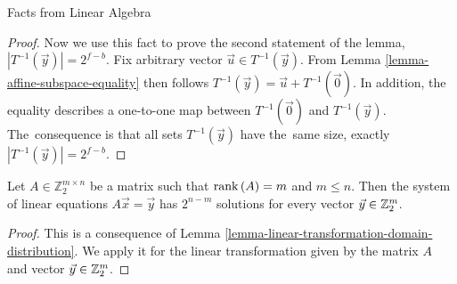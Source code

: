 \begin{chapter}{Facts from Linear Algebra}
\begin{proof}
Now we use this fact to prove the second statement of the lemma, $|T^{-1}(\vec{y})| = 2 ^ {f - b}$. Fix arbitrary vector $\vec{u} \in T^{-1}(\vec{y})$. From Lemma \ref{lemma-affine-subspace-equality} then follows $T^{-1}(\vec{y}) = \vec{u} + T^{-1}(\vec{0})$. In addition, the equality describes a one-to-one map between $T^{-1}(\vec{0})$ and $T^{-1}(\vec{y})$. The~consequence is that all sets $T^{-1}(\vec{y})$ have the~same size, exactly $|T^{-1}(\vec{y})| = 2^{f - b}$.
\end{proof}

\begin{lemma}
\label{lemma-system-of-linear-equations-solution-count}
Let $A \in \mathbb{Z}_2^{m \times n}$ be a matrix such that $\mathrm{rank}\left({A}\right) = m$ and $m \leq n$. Then the system of linear equations $A\vec{x} = \vec{y}$ has $2 ^ {n - m}$ solutions for every vector $\vec{y} \in \mathbb{Z}_{2}^{m}$.
\end{lemma}
\begin{proof}
This is a consequence of Lemma \ref{lemma-linear-transformation-domain-distribution}. We apply it for the linear transformation given by the matrix $A$ and vector $\vec{y} \in \mathbb{Z}_{2}^{m}$.



\end{proof}
\end{chapter}
